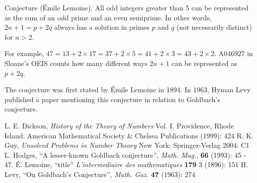 \documentclass[12pt]{article}
\begin{document}
Conjecture (\'Emile Lemoine). All odd integers greater than 5 can be represented as the sum of an odd prime and an even semiprime. In other words, $2n + 1 = p + 2q$ always has a solution in primes $p$ and $q$ (not necessarily distinct) for $n > 2$.

For example, $47 = 13 + 2 \times 17 = 37 + 2 \times 5 = 41 + 2 \times 3 = 43 + 2 \times 2$. A046927 in Sloane's OEIS counts how many different ways $2n + 1$ can be represented as $p + 2q$.

The conjecture was first stated by \'Emile Lemoine in 1894. In 1963, Hyman Levy published a paper mentioning this conjecture in relation to Goldbach's conjecture.

\begin{thebibliography}{3}
 L. E. Dickson, {\it History of the Theory of Numbers} Vol. I. Providence, Rhode Island: American Mathematical Society \& Chelsea Publications (1999): 424
 R. K. Guy, {\it Unsolved Problems in Number Theory} New York: Springer-Verlag 2004: C1
 L. Hodges, ``A lesser-known Goldbach conjecture'', {\it Math. Mag.}, {\bf 66} (1993): 45 - 47. 
 \'E. Lemoine, ``title'' {\it L'intermediaire des mathematiques} {\bf 179} 3 (1896): 151
 H. Levy, ``On Goldbach's Conjecture'', {\it Math. Gaz.} {\bf 47} (1963): 274
\end{thebibliography}
\end{document}
